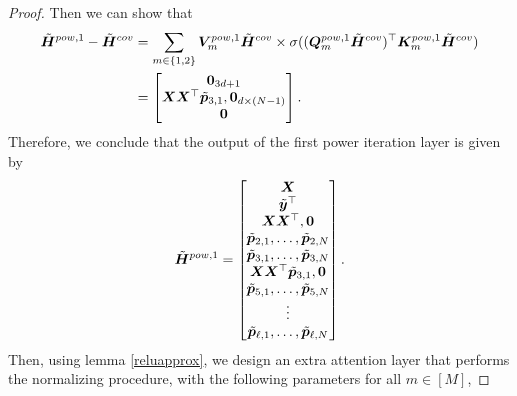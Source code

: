 \begin{proof}
    Then we can show that 
    \begin{align*}
        \tilde{\boldsymbol{H}}^{pow,1}-\tilde{\boldsymbol{H}}^{cov}&=\sum_{m\in\{1,2\}}\boldsymbol{V}_m^{pow,1}\tilde{\boldsymbol{H}}^{cov}\times\sigma((\boldsymbol{Q}_m^{pow,1}\tilde{\boldsymbol{H}}^{cov})^\top\boldsymbol{K}_m^{pow,1}\tilde{\boldsymbol{H}}^{cov})\\
        &=\begin{bmatrix}
            \boldsymbol{0}_{3d+1}\\
            \boldsymbol{X}\boldsymbol{X}^\top\tilde{\boldsymbol{p}}_{3,1},\boldsymbol{0}_{d\times(N-1)}\\
            \boldsymbol{0}
        \end{bmatrix}.
    \end{align*}
    Therefore, we conclude that the output of the first power iteration layer is given by
    \begin{align*}
        \tilde{\boldsymbol{H}}^{pow,1}=\begin{bmatrix}
            \boldsymbol{X}\\
            \tilde{\boldsymbol{y}}^\top\\
            \boldsymbol{X}\boldsymbol{X}^\top,\boldsymbol{0}\\
            \tilde{\boldsymbol{p}}_{2,1},\ldots,\tilde{\boldsymbol{p}}_{2,N}\\
            \tilde{\boldsymbol{p}}_{3,1},\ldots,\tilde{\boldsymbol{p}}_{3,N}\\
            \boldsymbol{X}\boldsymbol{X}^\top\tilde{\boldsymbol{p}}_{3,1},\boldsymbol{0}\\
            \tilde{\boldsymbol{p}}_{5,1},\ldots,\tilde{\boldsymbol{p}}_{5,N}\\
            \vdots\\
            \tilde{\boldsymbol{p}}_{\ell,1},\ldots,\tilde{\boldsymbol{p}}_{\ell,N}
        \end{bmatrix}.
    \end{align*}
    Then, using lemma \ref{reluapprox}, we design an extra attention layer that performs the normalizing procedure, with the following parameters for all $m\in[M]$,

\end{proof}
